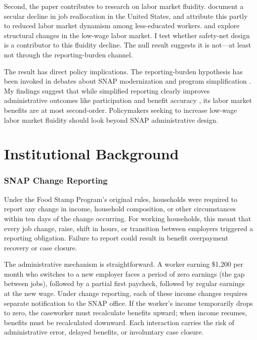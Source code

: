 \documentclass[12pt]{article}
\begin{document}
Second, the paper contributes to research on labor market fluidity. \citet{davis2012labor} document a secular decline in job reallocation in the United States, and \citet{molloy2016understanding} attribute this partly to reduced labor market dynamism among less-educated workers. \citet{autor2013anatomy} and \citet{krueger2017evolution} explore structural changes in the low-wage labor market. I test whether safety-net design is a contributor to this fluidity decline. The null result suggests it is not---at least not through the reporting-burden channel.

The result has direct policy implications. The reporting-burden hypothesis has been invoked in debates about SNAP modernization and program simplification \citep{usda2023snap}. My findings suggest that while simplified reporting clearly improves administrative outcomes like participation and benefit accuracy \citep{gray2019snap}, its labor market benefits are at most second-order. Policymakers seeking to increase low-wage labor market fluidity should look beyond SNAP administrative design.

\section{Institutional Background}

\subsubsection*{SNAP Change Reporting} Under the Food Stamp Program's original rules, households were required to report any change in income, household composition, or other circumstances within ten days of the change occurring. For working households, this meant that every job change, raise, shift in hours, or transition between employers triggered a reporting obligation. Failure to report could result in benefit overpayment recovery or case closure.

The administrative mechanism is straightforward. A worker earning \$1,200 per month who switches to a new employer faces a period of zero earnings (the gap between jobs), followed by a partial first paycheck, followed by regular earnings at the new wage. Under change reporting, each of these income changes requires separate notification to the SNAP office. If the worker's income temporarily drops to zero, the caseworker must recalculate benefits upward; when income resumes, benefits must be recalculated downward. Each interaction carries the risk of administrative error, delayed benefits, or involuntary case closure.
\end{document}
